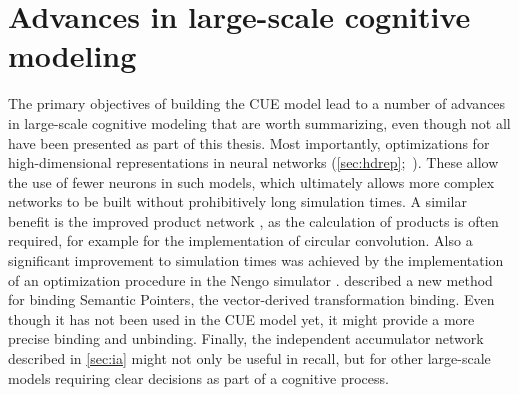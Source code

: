 \section{Advances in large-scale cognitive modeling}
The primary objectives of building the CUE model lead to a number of advances in large-scale cognitive modeling that are worth summarizing, even though not all have been presented as part of this thesis.
Most importantly, optimizations for high-dimensional representations in neural networks (\cref{sec:hdrep};\ \cite{gosmann216}).
These allow the use of fewer neurons in such models, which ultimately allows more complex networks to be built without prohibitively long simulation times.
A similar benefit is the improved product network \parencite{gosmann2015-1}, as the calculation of products is often required, for example for the implementation of circular convolution.
Also a significant improvement to simulation times was achieved by the implementation of an optimization procedure in the Nengo simulator \parencite{gosmann2017}.
 described a new method for binding Semantic Pointers, the vector-derived transformation binding.
Even though it has not been used in the CUE model yet, it might provide a more precise binding and unbinding.
Finally, the independent accumulator network described in \cref{sec:ia} might not only be useful in recall, but for other large-scale models requiring clear decisions as part of a cognitive process.

